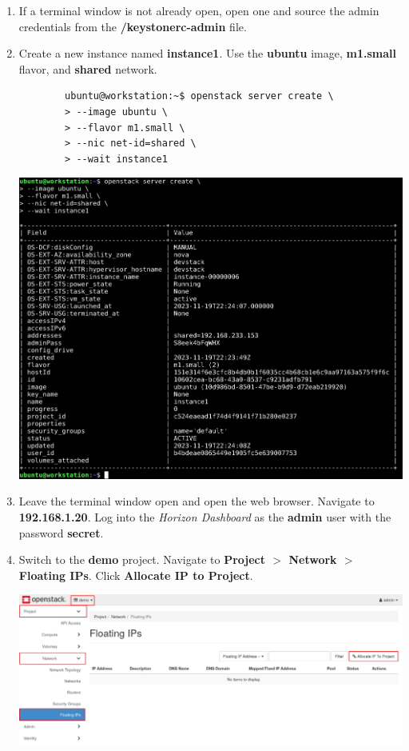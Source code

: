 \documentclass[letterpaper, 12pt]{article}
\begin{document}
\begin{enumerate}
    \item If a terminal window is not already open, open one and source the admin credentials from the 
    \textbf{\texttildemid/keystonerc-admin} file.

    \item Create a new instance named \textbf{instance1}. Use the \textbf{ubuntu} image, \textbf{m1.small} flavor, and
    \textbf{shared} network.
    \begin{lstlisting}
        ubuntu@workstation:~$ openstack server create \
        > --image ubuntu \
        > --flavor m1.small \
        > --nic net-id=shared \
        > --wait instance1
    \end{lstlisting}

    \begin{center}
        \includegraphics[width=\linewidth]{images/part3/step2.png}
    \end{center}

    \item Leave the terminal window open and open the web browser. Navigate to \textbf{192.168.1.20}. Log into the
    \textit{Horizon Dashboard} as the \textbf{admin} user with the password \textbf{secret}.


    \item Switch to the \textbf{demo} project. Navigate to \textbf{Project $>$ Network $>$ Floating IPs}. Click
    \textbf{Allocate IP to Project}.

    \begin{center}
        \includegraphics[width=\linewidth]{images/part3/step4.png}
    \end{center}


\end{enumerate}
\end{document}
